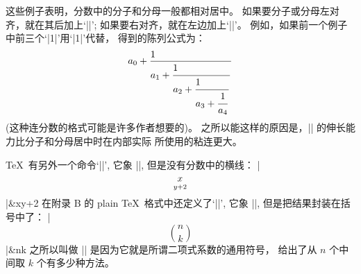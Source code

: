 \danger 这些例子表明，分数中的分子和分母一般都相对居中。%
如果要分子或分母左对齐，就在其后加上`|\hfill|';
如果要右对齐，就在左边加上`|\hfill|'。%
例如，如果前一个例子中前三个`|1\over|'用`|1\hfill\over|'代替，
得到的陈列公式为：
$$a_0+{1\hfill\over\displaystyle a_1+
          {\strut1\hfill\over\displaystyle a_2+
            {\strut1\hfill\over\displaystyle a_3+
              {\strut1\over a_4}}}}$$
(这种连分数的格式可能是许多作者想要的)。
之所以能这样的原因是，|\hfill| 的伸长能力比分子和分母居中时在内部实际%
所使用的粘连更大。

\1\TeX\ 有另外一个命令`|\atop|', 它象 |\over|, 但是没有分数中的横线：
\begindisplaymathdemo
|$$x\atop y+2$$|&x\atop y+2\cr
\endmathdemo
在附录 B 的 plain \TeX\ 格式中还定义了`|\choose|',
它象 |\atop|, 但是把结果封装在括号中了：
\begindisplaymathdemo
|$$n\choose k$$|&n\choose k\cr
\endmathdemo
之所以叫做 |\choose| 是因为它就是所谓二项式系数的通用符号，
给出了从 $n$ 个中间取 $k$ 个有多少种方法。

